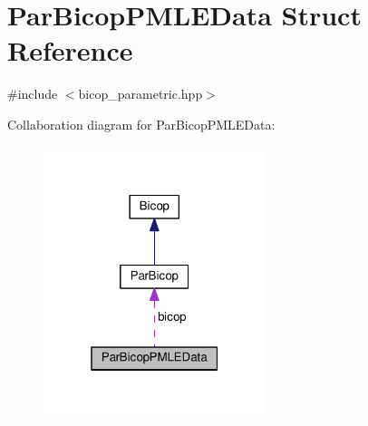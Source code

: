 \hypertarget{struct_par_bicop_p_m_l_e_data}{\section{Par\+Bicop\+P\+M\+L\+E\+Data Struct Reference}
\label{struct_par_bicop_p_m_l_e_data}
}


{\ttfamily \#include $<$bicop\+\_\+parametric.\+hpp$>$}



Collaboration diagram for Par\+Bicop\+P\+M\+L\+E\+Data\+:\nopagebreak
\begin{figure}[H]
\begin{center}
\leavevmode
\includegraphics[width=184pt]{struct_par_bicop_p_m_l_e_data__coll__graph}
\end{center}
\end{figure}
